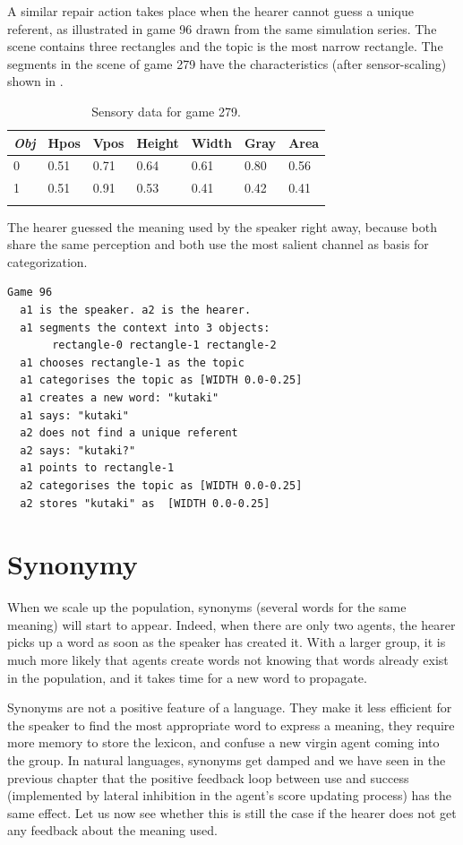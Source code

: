 A similar repair action takes place when the hearer
cannot guess a unique referent, as illustrated in
game 96 drawn from the same simulation series. 
The scene contains three rectangles and the 
topic is the most narrow rectangle. The segments in the scene of game 279
have the characteristics (after sensor-scaling) shown in . 
\begin{table}
\begin{center}
\begin{tabular}{ l  l  l  l  l  l  l }
\lsptoprule
{\itshape Obj}&Hpos&Vpos&Height&Width&Gray&Area \\ \midrule
0 &0.51 & 0.71 & 0.64 & 0.61 & 0.80 & 0.56\\ 
1 & 0.51 & 0.91 & 0.53 & 0.41 & 0.42 & 0.41 \\ 
\lspbottomrule
\end{tabular}
\caption{\label{tab:279} Sensory data for game 279.}
\end{center}
\end{table}
The hearer guessed the meaning used
by the speaker right away, because both 
share the same perception and both use the most 
salient channel as basis for categorization. 
\begin{verbatim}
Game 96
  a1 is the speaker. a2 is the hearer. 
  a1 segments the context into 3 objects: 
       rectangle-0 rectangle-1 rectangle-2
  a1 chooses rectangle-1 as the topic 
  a1 categorises the topic as [WIDTH 0.0-0.25]
  a1 creates a new word: "kutaki"
  a1 says: "kutaki"
  a2 does not find a unique referent
  a2 says: "kutaki?"
  a1 points to rectangle-1
  a2 categorises the topic as [WIDTH 0.0-0.25]
  a2 stores "kutaki" as  [WIDTH 0.0-0.25]
\end{verbatim}

\section{Synonymy}

When we scale up the population, synonyms (several words
for the same meaning) will start to appear. Indeed,
when there are only two agents, the hearer picks 
up a word as soon as the speaker has created it. With a larger
group, it is much more likely that agents create words
not knowing that words already exist in the population, and 
it takes time for a new word to propagate. 

Synonyms are not a positive feature of a language. They make 
it less efficient for the speaker to find the most 
appropriate word to express a meaning, they require more
memory to store the lexicon, and confuse a new virgin 
agent coming into the group. In natural languages, synonyms get
damped and we have seen in the previous chapter
that the positive feedback loop between 
use and success (implemented by lateral inhibition
in the agent's score updating process) has the same
effect. Let us now see whether this is still the 
case if the hearer does not get any feedback about the
meaning used. 


